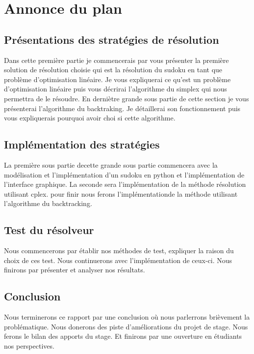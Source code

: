 \hypertarget{Annonce du plan}{%
\section{Annonce du plan}\label{annonce du plan}}

\subsection{Présentations des stratégies de résolution}

Dans cette première partie je commencerais par vous présenter la première solution de résolution choisie qui est la résolution du sudoku en tant que problème d'optimisation linéaire.\newline
Je vous expliquerai ce qu'est un problème d'optimisation linéaire puis vous décrirai l'algorithme du simplex qui nous permettra de le résoudre.\newline
En derniètre grande sous partie de cette section je vous présenterai l'algorithme du backtraking.\newline
Je détaillerai son fonctionnement puis vous expliquerais pourquoi avoir choi si cette algorithme.\newline
\subsection{Implémentation des stratégies}
La première sous partie decette grande sous partie commencera avec la modélisation et l'implémentation d'un sudoku en python et l'implémentation de l'interface graphique.\newline
La seconde sera l'implémentation de la méthode résolution utilisant cplex.\newline
pour finir nous ferons l'implémentationde la méthode utilisant l'algorithme du backtracking.\newline
\subsection{Test du résolveur}
Nous commencerons par établir nos méthodes de test, expliquer la raison du choix de ces test.\newline
Nous continuerons avec l'implémentation de ceux-ci.\newline
Nous finirons par présenter et analyser nos résultats.\newline
\subsection{Conclusion}
Nous terminerons ce rapport par une conclusion où nous parlerrons brièvement la problématique.\newline
Nous donerons des piste d'améliorations du projet de stage.\newline
Nous ferons le bilan des apports du stage.\newline
Et finirons par une ouverture en étudiants nos perspectives.
